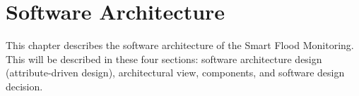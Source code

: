 \chapter{Software Architecture}
\label{ch:software}
This chapter describes the software architecture of the Smart Flood Monitoring. This will be described in these four sections: software architecture design (attribute-driven design), architectural view, components, and software design decision.







